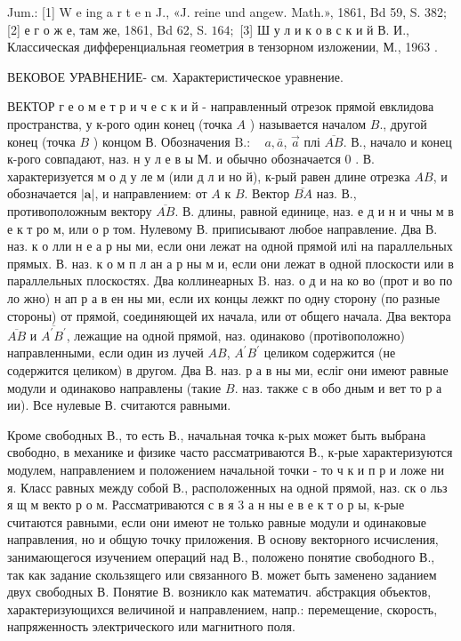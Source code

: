 \documentclass[10pt]{article}
\begin{document}
Jum.: [1] W e ing a r t e n J., «J. reine und angew. Math.», 1861, Bd 59, S. 382; [2] е г о ж е, там же, 1861, Bd 62, S. $164 ;$ [3] Ш у л и к о в с к и й В. И., Классическая дифференциальная геометрия в тензорном изложении, М., 1963 .



ВЕКОВОЕ УРАВНЕНИЕ- см. Характеристическое уравнение.



ВЕКТОР г е о м е т р и ч е с к и й - направленный отрезок прямой евклидова пространства, у к-рого один конец (точка $A$ ) называется началом $B$., другой конец (точка $B$ ) концом В. Обозначения $\mathrm{B} .: \quad a, \bar{a}$, $\vec{a}$ плі $\overline{A B}$. В., начало и конец к-рого совпадают, наз. н у л е в ы М. и обычно обозначается 0 . В. характеризуется м о д у ле м (или д л и но й), к-рый равен длине отрезка $A B$, и обозначается $|\boldsymbol{a}|$, и направлением: от $A$ к $B$. Вектор $\overline{B A}$ наз. В., противоположным вектору $\overline{A B}$. В. длины, равной единице, наз. е д и н и чны м в е к т ро м, или о р том. Нулевому В. приписывают любое направление. Два В. наз. к о лли н е а р ны ми, если они лежат на одной прямой илі на параллельных прямых. В. наз. к о м п л ан а р ны м и, если они лежат в одной плоскости или в параллельных плоскостях. Два коллинеарных $\mathrm{B}$. наз. о д и на ко во (прот и во по ло жно) н ап р а в ен ны ми, если их концы лежкт по одну сторону (по разные стороны) от прямой, соединяющей их начала, или от общего начала. Два вектора $\overline{A B}$ и $\overline{A^{\prime} B^{\prime}}$, лежащие на одной прямой, наз. одинаково (протівоположно) направленными, если один из лучей $A B$, $A^{\prime} B^{\prime}$ целиком содержится (не содержится целиком) в другом. Два В. наз. р а в ны ми, есліг они имеют равные модули и одинаково направлены (такие $B$. наз. также с в обо дным и вет то р а ии). Все нулевые В. считаются равными.



Кроме свободных В., то есть В., начальная точка к-рых может быть выбрана свободно, в механике и физике часто рассматриваются В., к-рые характеризуются модулем, направлением и положением начальной точки - то ч к и п р и ложе ни я. Класс равных между собой В., расположенных на одной прямой, наз. ск о льз я щ м векто р о м. Рассматриваются с в я 3 а н ны е в е к т о р ы, к-рые считаются равными, если они имеют не только равные модули и одинаковые направления, но и общую точку приложения. В основу векторного исчисления, занимающегося изучением операций над В., положено понятие свободного В., так как задание скользящего или связанного В. может быть заменено заданием двух свободных В. Понятие В. возникло как математич. абстракция объектов, характеризующихся величиной и направлением, напр.: перемещение, скорость, напряженность электрического или магнитного поля.
\end{document}

